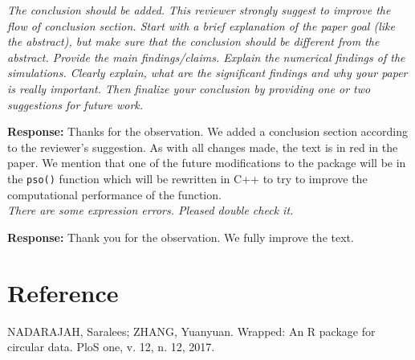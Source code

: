 \documentclass[a4paper,11pt]{exam}
\begin{document}
\begin{questions}
\question \textit{The conclusion should be added. This reviewer strongly suggest to improve the flow of conclusion section. Start with a brief explanation of the paper goal (like the abstract), but make sure that the conclusion should be different from the abstract. Provide the main findings/claims. Explain the numerical findings of the simulations. Clearly explain, what are the significant findings and why your paper is really important. Then finalize your conclusion by providing one or two suggestions for future work.}

\noindent \textbf{Response:} Thanks for the observation. We added a conclusion section according to the reviewer's suggestion. As with all changes made, the text is in red in the paper. We mention that one of the future modifications to the package will be in the \texttt{pso()} function which will be rewritten in \textsc{C++} to try to improve the computational performance of the function.\\ 

\question \textit{There are some expression errors. Pleased double check it.}

\noindent \textbf{Response:} Thank you for the observation. We fully improve the text.\\ 
\end{questions}

\section*{Reference}

NADARAJAH, Saralees; ZHANG, Yuanyuan. Wrapped: An R package for circular data. PloS one, v. 12, n. 12, 2017.
\end{document}
